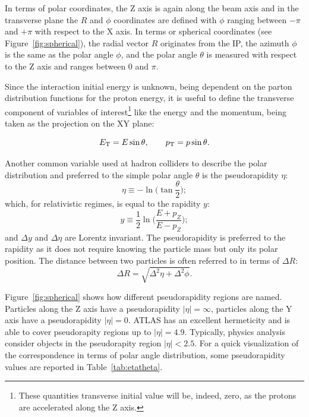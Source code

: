 In terms of polar coordinates, the Z axis is again along the beam axis and in the transverse plane 
the $R$ and $\phi$ coordinates are defined with $\phi$ ranging between 
$-\pi$ and $+\pi$ with respect to the X axis. In terms or spherical coordinates (see Figure~\ref{fig:spherical}),
the radial vector $R$ originates from the IP,  the azimuth $\phi$
is the same as the polar angle $\phi$, 
and the polar angle $\theta$ is measured with respect to the Z axis and
ranges between 0 and $\pi$. 

Since the interaction initial energy is unknown, being dependent on the parton distribution functions for the proton
energy, it is useful to define the transverse component of variables of 
interest\footnote{These quantities transverse initial value will be, indeed, zero, as the protons are accelerated along the Z axis.}  
like the energy and the momentum, being taken as the projection on the XY plane:

\begin{equation}\label{eq:transv}
\et = E\sin\theta, \qquad \pt = p\sin\theta.
	\end{equation}

Another common variable used at hadron colliders to describe the polar distribution and preferred to the simple
polar angle $\theta$ is the pseudorapidity $\eta$:
\begin{equation}\label{eq:pseudorapidity}
        \eta \equiv -\ln\bigg(\tan\frac{\theta}{2}\bigg);
	\end{equation}
which, for relativistic regimes, is equal to the rapidity $y$:
\begin{equation}\label{eq:rapidity}
y \equiv \frac{1}{2} \ln \bigg(\frac{E+p_{Z}}{E-p_{Z}}\bigg);
	\end{equation}
and $\Delta y$ and $\Delta \eta$ are Lorentz invariant. The pseudorapidity is preferred
to the rapidity as it does not require knowing the particle mass but only its polar position.
The distance between two particles is often referred to in terms of $\Delta R$:
\begin{equation}\label{eq:deltar}
\Delta R = \sqrt{\Delta^{2}\eta + \Delta^{2}\phi}.
	\end{equation}


Figure~\ref{fig:spherical} shows how different pseudorapidity regions are named. Particles
along the Z axis have a pseudorapidity $|\eta|=\infty$, particles along the Y axis have
a pseudorapidity $|\eta|=0$. ATLAS has an excellent hermeticity and is able to cover 
pseudorapity regions up to $|\eta|=4.9$. Typically, physics analysis consider objects in
the pseudorapity region  $|\eta|<2.5$. For a quick visualization of the correspondence
in terms of polar angle distribution, some pseudorapidity values are reported in Table~\ref{tab:etatheta}.


